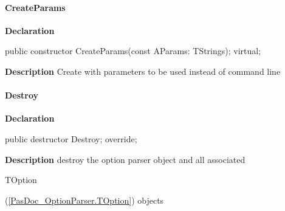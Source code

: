 \documentclass{report}
\newif\ifpdf
\begin{document}
\paragraph*{CreateParams}\hspace*{\fill}

\label{PasDoc_OptionParser.TOptionParser-CreateParams}
\begin{list}{}{
\setlength{\itemindent}{0cm}
\setlength{\listparindent}{0cm}
\setlength{\leftmargin}{\evensidemargin}
\addtolength{\leftmargin}{\tmplength}
\settowidth{\labelsep}{X}
\addtolength{\leftmargin}{\labelsep}
\setlength{\labelwidth}{\tmplength}
}
\item[\textbf{Declaration}\hfill]
\ifpdf
\begin{flushleft}
\fi
\begin{ttfamily}
public constructor CreateParams(const AParams: TStrings); virtual;\end{ttfamily}

\ifpdf
\end{flushleft}
\fi

\par
\item[\textbf{Description}]
Create with parameters to be used instead of command line

\end{list}
\paragraph*{Destroy}\hspace*{\fill}

\label{PasDoc_OptionParser.TOptionParser-Destroy}
\begin{list}{}{
\setlength{\itemindent}{0cm}
\setlength{\listparindent}{0cm}
\setlength{\leftmargin}{\evensidemargin}
\addtolength{\leftmargin}{\tmplength}
\settowidth{\labelsep}{X}
\addtolength{\leftmargin}{\labelsep}
\setlength{\labelwidth}{\tmplength}
}
\item[\textbf{Declaration}\hfill]
\ifpdf
\begin{flushleft}
\fi
\begin{ttfamily}
public destructor Destroy; override;\end{ttfamily}

\ifpdf
\end{flushleft}
\fi

\par
\item[\textbf{Description}]
destroy the option parser object and all associated \begin{ttfamily}TOption\end{ttfamily}(\ref{PasDoc_OptionParser.TOption}) objects

\end{list}
\end{document}
